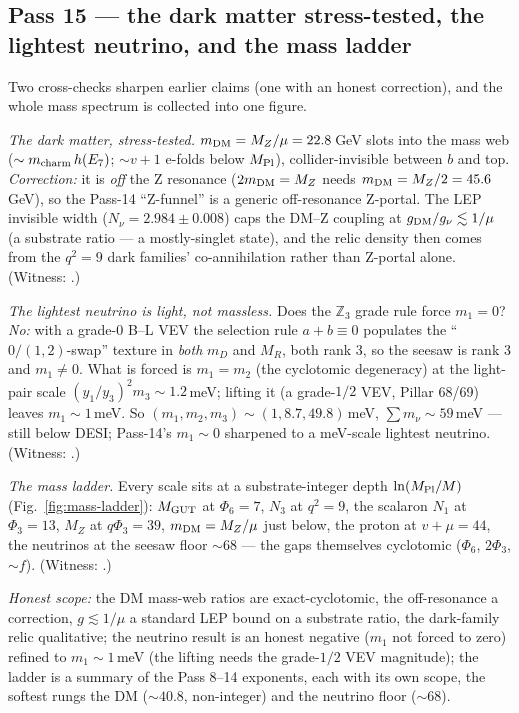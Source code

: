 \documentclass[11pt]{article}
\begin{document}
\subsection{Pass 15 --- the dark matter stress-tested, the lightest neutrino, and the mass ladder}
\label{sec:capstone-fifteen}

Two cross-checks sharpen earlier claims (one with an honest correction), and the whole mass
spectrum is collected into one figure.

\emph{The dark matter, stress-tested.} $m_{\rm DM}=M_Z/\mu=22.8$\,GeV slots into the mass
web ($\sim m_{\rm charm}\,h(E_7)$; $\sim v+1$ e-folds below $M_{\rm Pl}$), collider-invisible
between $b$ and top. \emph{Correction:} it is \emph{off} the Z resonance ($2m_{\rm DM}=M_Z$
needs $m_{\rm DM}=M_Z/2=45.6$\,GeV), so the Pass-14 ``Z-funnel'' is a generic off-resonance
Z-portal. The LEP invisible width ($N_\nu=2.984\pm0.008$) caps the DM--Z coupling at
$g_{\rm DM}/g_\nu\lesssim1/\mu$ (a substrate ratio --- a mostly-singlet state), and the relic
density then comes from the $q^2=9$ dark families' co-annihilation rather than Z-portal alone.
(Witness: .)

\emph{The lightest neutrino is light, not massless.} Does the $\mathbb{Z}_3$ grade rule force
$m_1=0$? \emph{No:} with a grade-0 B--L VEV the selection rule $a+b\equiv0$ populates the
``$0/(1,2)$-swap'' texture in \emph{both} $m_D$ and $M_R$, both rank 3, so the seesaw is rank
3 and $m_1\ne0$. What is forced is $m_1=m_2$ (the cyclotomic degeneracy) at the light-pair
scale $(y_1/y_3)^2m_3\sim1.2$\,meV; lifting it (a grade-$1/2$ VEV, Pillar 68/69) leaves
$m_1\sim1$\,meV. So $(m_1,m_2,m_3)\sim(1,8.7,49.8)$\,meV, $\sum m_\nu\sim59$\,meV --- still
below DESI; Pass-14's $m_1\sim0$ sharpened to a meV-scale lightest neutrino. (Witness:
.)

\emph{The mass ladder.} Every scale sits at a substrate-integer depth $\ln(M_{\rm Pl}/M)$
(Fig.~\ref{fig:mass-ladder}): $M_{\rm GUT}$ at $\Phi_6=7$, $N_3$ at $q^2=9$, the scalaron
$N_1$ at $\Phi_3=13$, $M_Z$ at $q\Phi_3=39$, $m_{\rm DM}=M_Z/\mu$ just below, the proton at
$v+\mu=44$, the neutrinos at the seesaw floor $\sim68$ --- the gaps themselves cyclotomic
($\Phi_6$, $2\Phi_3$, $\sim f$). (Witness: .)



\emph{Honest scope:} the DM mass-web ratios are exact-cyclotomic, the off-resonance a
correction, $g\lesssim1/\mu$ a standard LEP bound on a substrate ratio, the dark-family relic
qualitative; the neutrino result is an honest negative ($m_1$ not forced to zero) refined to
$m_1\sim1$\,meV (the lifting needs the grade-$1/2$ VEV magnitude); the ladder is a summary of
the Pass 8--14 exponents, each with its own scope, the softest rungs the DM ($\sim40.8$,
non-integer) and the neutrino floor ($\sim68$).
\end{document}
